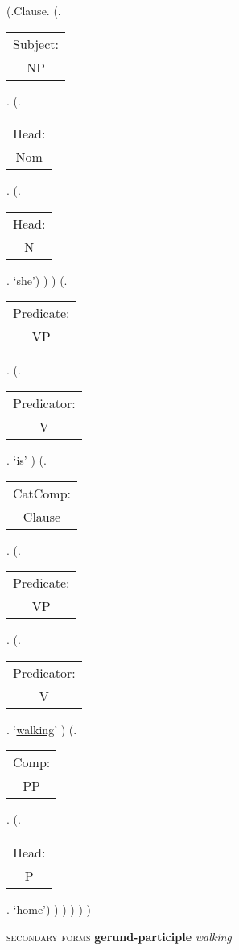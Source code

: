 \documentclass[12pt,letterpaper]{article}
\begin{document}
\begin{figure}
	\begin{center}
		\begin{parsetree}
			(.Clause.
			(.\begin{tabular}{c}Subject:\\NP\end{tabular}.  
			(.\begin{tabular}{c}Head:\\Nom\end{tabular}.
			(.\begin{tabular}{c}Head:\\N\end{tabular}. `she')
			)
			)
			(.\begin{tabular}{c}Predicate:\\VP\end{tabular}.
			(.\begin{tabular}{c}Predicator:\\V\end{tabular}.    `is' )
			(.\begin{tabular}{c}CatComp:\\Clause\end{tabular}. 
			(.\begin{tabular}{c}Predicate:\\VP\end{tabular}.
			(.\begin{tabular}{c}Predicator:\\V\end{tabular}.    `\underline{walking}' )
			(.\begin{tabular}{c}Comp:\\PP\end{tabular}. 
			(.\begin{tabular}{c}Head:\\P\end{tabular}. `home')
			)
			)
			)
			)
			) 
			
		\end{parsetree}
		\hfill \break \hfill {} \textsc{secondary forms} \textbf{gerund-participle} \textit{walking}
	\end{center}
\end{figure}
\end{document}
